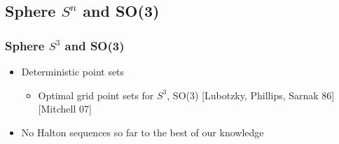 \documentclass[serif]{beamer} %
\begin{document}
\subsection{Sphere $S^n$ and SO(3)} %
\label{sub:sphere_s_n_and_so_3_}
\begin{frame}
  \frametitle{Sphere $S^3$ and SO(3)}
\begin{itemize}
  \item Deterministic point sets 
  \begin{itemize}
    \item Optimal grid point sets for $S^3$, SO(3) [Lubotzky, Phillips, Sarnak 86] [Mitchell 07]
  \end{itemize}
  \item No Halton sequences so far to the best of our knowledge
\end{itemize}
\end{frame}
\end{document}
